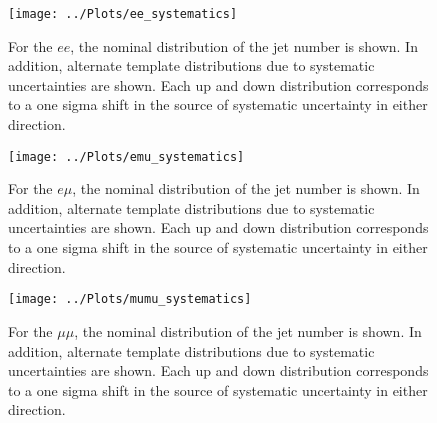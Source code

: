 \documentclass[11pt]{article}
\begin{document}
\begin{figure}[htbp]
  \begin{center}
    \texttt{[image: ../Plots/ee\_systematics]}
      \caption{For the $ee$, the nominal distribution of the jet number is shown.  In addition, alternate template distributions due to systematic uncertainties are shown.  Each up and down distribution corresponds to a one sigma shift in the source of systematic uncertainty in either direction.}
  \end{center}
\end{figure}
\begin{figure}[htbp]
  \begin{center}
    \texttt{[image: ../Plots/emu\_systematics]}
      \caption{For the $e \mu$, the nominal distribution of the jet number is shown.  In addition, alternate template distributions due to systematic uncertainties are shown.  Each up and down distribution corresponds to a one sigma shift in the source of systematic uncertainty in either direction.}
  \end{center}
\end{figure}
\begin{figure}[htbp]
  \begin{center}
    \texttt{[image: ../Plots/mumu\_systematics]}
      \caption{For the $\mu \mu$, the nominal distribution of the jet number is shown.  In addition, alternate template distributions due to systematic uncertainties are shown.  Each up and down distribution corresponds to a one sigma shift in the source of systematic uncertainty in either direction.}
  \end{center}
\end{figure}


\clearpage
\newpage




    
\end{document}
